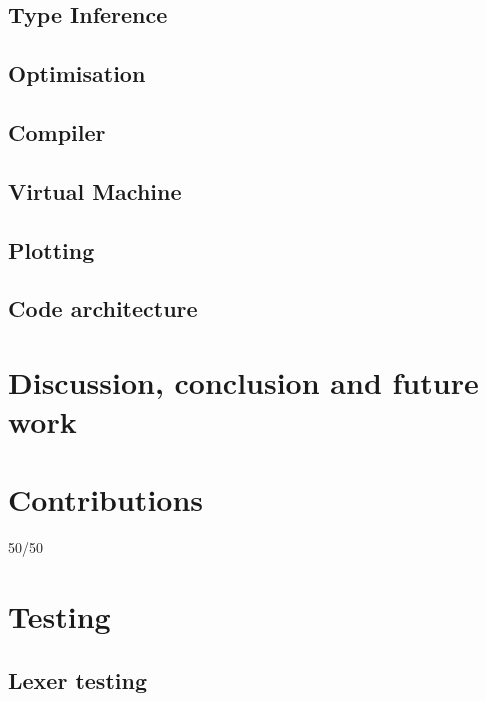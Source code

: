 \documentclass[a4paper, oneside, 11pt]{report}
\begin{document}
\section{Type Inference}\label{sec:type-inference}

\section{Optimisation}\label{sec:optimisation}

\section{Compiler}\label{sec:compiler}

\section{Virtual Machine}\label{sec:virtual-machine}

\section{Plotting}\label{sec:plotting}

\section{Code architecture}\label{sec:code-architecture}

\chapter{Discussion, conclusion and future work}\label{ch:discussion-conclusion-and-future-work}





\appendix
\chapter{Contributions}\label{ch:contributions}

50/50

\chapter{Testing}\label{ch:test}

\section{Lexer testing}\label{sec:lexer-testing}
\end{document}
